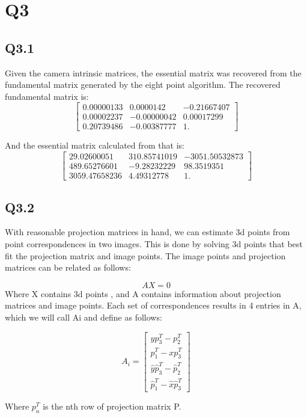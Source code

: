 \documentclass[12pt]{article}
\begin{document}
\newpage
\section{Q3}
\subsection{Q3.1}
Given the camera intrinsic matrices, the essential matrix was recovered from the fundamental matrix generated by the eight point algorithm.
The recovered fundamental matrix is:
$$
\begin{bmatrix}
0.00000133 & 0.0000142   & -0.21667407 \\
0.00002237 & -0.00000042 &  0.00017299 \\
0.20739486 & -0.00387777 &  1.        
\end{bmatrix}
$$

And the essential matrix calculated from that is:
$$
\begin{bmatrix}
29.02600051   &  310.85741019 & -3051.50532873 \\
489.65276601  &  -9.28232229  & 98.3519351 \\
3059.47658236 &    4.49312778 &    1.       
\end{bmatrix}
$$

\newpage
\subsection{Q3.2}
With reasonable projection matrices in hand, we can estimate 3d points from point correspondences in two images.  This is done by solving 3d points that best fit the projection matrix and image points.
The image points and projection matrices can be related as follows:  
  
$$
AX = 0
$$
Where X contains 3d points , and A contains information about projection matrices and image points. Each set of correspondences results in 4 entries in A, which we will call Ai and define as follows:

$$
A_{i} = 
\begin{bmatrix}
y p_{3}^{T} - p_{2}^{T} \\
p_{1}^{T} - x p_{3}^{T} \\
\hat{y} \hat{p}_{3}^{T} - \hat{p}_{2}^{T} \\
\hat{p}_{1}^{T} - \hat{x} \hat{p}_{3}^{T} 
\end{bmatrix}
$$
  
Where $p_{n}^{T}$ is the nth row of projection matrix P.
\end{document}
